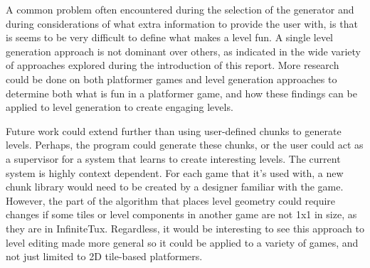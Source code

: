 A common problem often encountered during the selection of the generator and during 
considerations of what extra information to provide the user with, is that is seems to be
very difficult to define what makes a level fun. A single level generation approach is not
dominant over others, as indicated in the wide variety of approaches explored during the
introduction of this report. More research could be done on both platformer games and level
generation approaches to determine both what is fun in a platformer game, and how these
findings can be applied to level generation to create engaging levels.

Future work could extend further than using user-defined chunks to generate levels.
Perhaps, the program could generate these chunks, or the user could act as a supervisor for
a system that learns to create interesting levels. The current system is highly context
dependent. For each game that it's used with, a new chunk library would need to be created
by a designer familiar with the game. However, the part of the algorithm that places level
geometry could require changes if some tiles or level components in another game are not
1x1 in size, as they are in InfiniteTux. Regardless, it would be interesting to see this
approach to level editing made more general so it could be applied to a variety of games, and
not just limited to 2D tile-based platformers.